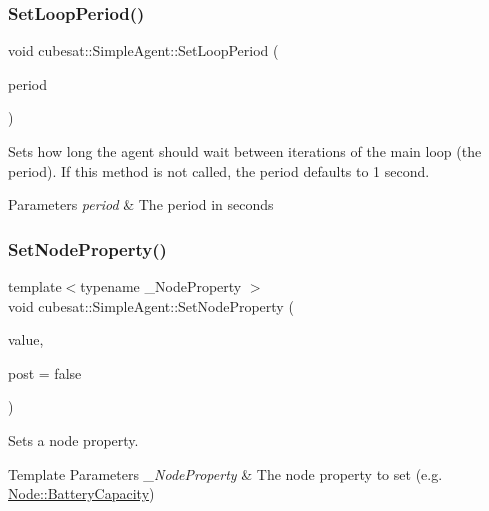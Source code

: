 \subsubsection{\texorpdfstring{Set\+Loop\+Period()}{SetLoopPeriod()}}
{\footnotesize\ttfamily void cubesat\+::\+Simple\+Agent\+::\+Set\+Loop\+Period (\begin{DoxyParamCaption}\item[{double}]{period }\end{DoxyParamCaption})\hspace{0.3cm}{\ttfamily [inline]}}



Sets how long the agent should wait between iterations of the main loop (the period). If this method is not called, the period defaults to 1 second. 


\begin{DoxyParams}{Parameters}
{\em period} & The period in seconds \\
\hline
\end{DoxyParams}
\mbox{\label{classcubesat_1_1SimpleAgent_a42fdb89f78e67399925764a75ccc015c}} 
\subsubsection{\texorpdfstring{Set\+Node\+Property()}{SetNodeProperty()}}
{\footnotesize\ttfamily template$<$typename \+\_\+\+Node\+Property $>$ \\
void cubesat\+::\+Simple\+Agent\+::\+Set\+Node\+Property (\begin{DoxyParamCaption}\item[{typename \+\_\+\+Node\+Property\+::\+Value\+Type}]{value,  }\item[{bool}]{post = {\ttfamily false} }\end{DoxyParamCaption})\hspace{0.3cm}{\ttfamily [inline]}}



Sets a node property. 


\begin{DoxyTemplParams}{Template Parameters}
{\em \+\_\+\+Node\+Property} & The node property to set (e.\+g. \hyperlink{structcubesat_1_1Node_1_1BatteryCapacity}{Node\+::\+Battery\+Capacity}) \\
\hline
\end{DoxyTemplParams}

